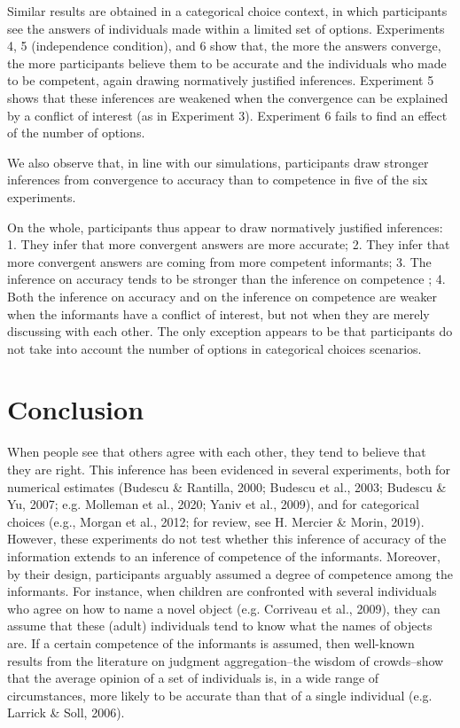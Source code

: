 \documentclass[
  doc,floatsintext]{apa6}
\begin{document}
Similar results are obtained in a categorical choice context, in which participants see the answers of individuals made within a limited set of options. Experiments 4, 5 (independence condition), and 6 show that, the more the answers converge, the more participants believe them to be accurate and the individuals who made to be competent, again drawing normatively justified inferences. Experiment 5 shows that these inferences are weakened when the convergence can be explained by a conflict of interest (as in Experiment 3). Experiment 6 fails to find an effect of the number of options.

We also observe that, in line with our simulations, participants draw stronger inferences from convergence to accuracy than to competence in five of the six experiments.

On the whole, participants thus appear to draw normatively justified inferences: 1. They infer that more convergent answers are more accurate; 2. They infer that more convergent answers are coming from more competent informants; 3. The inference on accuracy tends to be stronger than the inference on competence ; 4. Both the inference on accuracy and on the inference on competence are weaker when the informants have a conflict of interest, but not when they are merely discussing with each other. The only exception appears to be that participants do not take into account the number of options in categorical choices scenarios.

\section{Conclusion}\label{conclusion}

When people see that others agree with each other, they tend to believe that they are right. This inference has been evidenced in several experiments, both for numerical estimates (Budescu \& Rantilla, 2000; Budescu et al., 2003; Budescu \& Yu, 2007; e.g. Molleman et al., 2020; Yaniv et al., 2009), and for categorical choices (e.g., Morgan et al., 2012; for review, see H. Mercier \& Morin, 2019). However, these experiments do not test whether this inference of accuracy of the information extends to an inference of competence of the informants. Moreover, by their design, participants arguably assumed a degree of competence among the informants. For instance, when children are confronted with several individuals who agree on how to name a novel object (e.g. Corriveau et al., 2009), they can assume that these (adult) individuals tend to know what the names of objects are. If a certain competence of the informants is assumed, then well-known results from the literature on judgment aggregation--the wisdom of crowds--show that the average opinion of a set of individuals is, in a wide range of circumstances, more likely to be accurate than that of a single individual (e.g. Larrick \& Soll, 2006).
\end{document}
